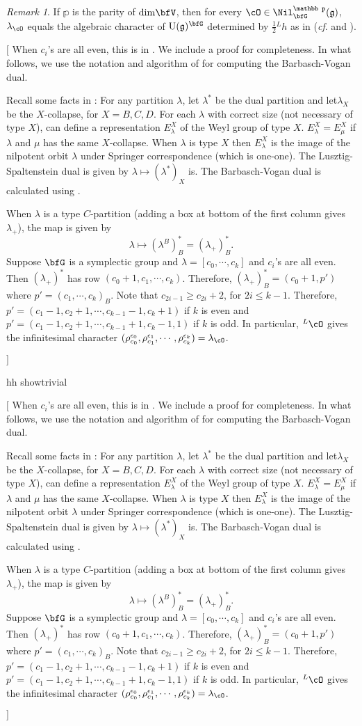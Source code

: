 \documentclass[12pt,a4paper]{amsart}
\newcommand{\trivial}[2][]{\if\relax\detokenize{#1}\relax
  {%
      \color{orange} \vspace{0em} $[$  #2 $]$
      \color{black}
  }
  \else
\ifx#1h
\ifcsname showtrivial\endcsname
{%
    \color{orange} \vspace{0em}  $[$ #2 $]$
    \color{black}
}
\fi
\else {\red Wrong argument!} \fi
\fi
}
\newcommand{\oU}{\operatorname{U}}
\newcommand{\g}{\mathfrak g}
\numberwithin{equation}{section}
\theoremstyle{remark}
\newtheorem*{remark}{Remark}
\def\half{{\tfrac{1}{2}}}
\begin{document}
\begin{remark}
 If $\mathbb p$ is the parity of $\dim \!\bfV$, then for every $\cO\in \Nil^{\mathbb p}_{\bfG}(\g)$,
 $\lambda_\cO$ equals  the algebraic character of $\oU(\g)^{\bfG}$ determined by
$\half {^{L}h}$ as in \cite[Equation~(1.5)]{BVUni} (\emph{cf}.
  \cite[Proposition 1.12]{Tr} and  \cite[Section~7]{So}).
\end{remark}
\trivial[h]{
  When $c_i$'s are all even, this is in
  \cite[Proposition 1.12]{Tr}. We include a proof for completeness.  In what
  follows, we use the notation and algorithm of \cite[Section~7]{So} for
  computing the Barbasch-Vogan dual.

  Recall some facts in \cite[Section~7]{So}: For any partition $\lambda$, let
  $\lambda^*$ be the dual partition and let$\lambda_X$ be the $X$-collapse, for
  $X = B,C,D$. For each $\lambda$ with correct size (not necessary of type $X$),
  can define a representation $E_\lambda^X$ of the Weyl group of type $X$.
  $E^X_\lambda = E^X_\mu$ if $\lambda$ and $\mu$ has the same $X$-collapse.
  When $\lambda$ is type $X$ then $E^X_{\lambda}$ is the image of the nilpotent
  orbit $\lambda$ under Springer correspondence (which is one-one). The Lusztig-Spaltenstein dual
  is given by $\lambda \mapsto (\lambda^*)_X$ is.
  The Barbasch-Vogan dual is calculated using \cite[Lemma~11]{So}.

  When
  $\lambda$ is a type $C$-partition  (adding a box at bottom of the first column gives
  $\lambda_+$), the map is given by
  \[
    \lambda \mapsto (\lambda^B)^*_B = (\lambda_+)^*_B.
  \]
    Suppose $\bfG$ is a symplectic group and  $\lambda = [c_0,\cdots, c_k]$ and $c_i$'s are all even. Then
  $(\lambda_+)^*$ has row $(c_0+1,c_1, \cdots, c_k)$. Therefore,
  $(\lambda_+)^*_B = (c_0+1,p')$ where $p' = (c_1, \cdots, c_k)_B$.  Note that $c_{2i-1}\geq c_{2i}+2$, for $2i\leq k-1$. Therefore, $p' =
  (c_1-1,c_2+1, \cdots, c_{k-1}-1, c_k+1)$ if $k$ is even and $p' =
  (c_1-1,c_2+1, \cdots, c_{k-1}+1, c_k-1,1)$ if $k$ is odd. In
  particular, ${^{L}\cO}$ gives the infinitesimal character
  $(\rho^{\epsilon_0}_{c_0}, \rho^{\epsilon_{1}}_{c_{1}},\cdots,
  \rho^{\epsilon_k}_{c_k})=\lambda_{\cO}$.



}
\end{document}
